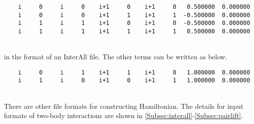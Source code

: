 \begin{description}
\begin{minipage}{16cm}
\begin{screen}
\begin{verbatim}
    i     0     i     0    i+1     0    i+1     0   0.500000  0.000000
    i     0     i     0    i+1     1    i+1     1  -0.500000  0.000000
    i     1     i     1    i+1     0    i+1     0  -0.500000  0.000000
    i     1     i     1    i+1     1    i+1     1   0.500000  0.000000
\end{verbatim}
\end{screen}
\end{minipage}
~\\
in the format of an InterAll file. The other terms can be written as below.\\
\begin{minipage}{16cm}
\begin{screen}
\begin{verbatim}
    i     0     i     1    i+1     1    i+1     0   1.000000  0.000000
    i     1     i     0    i+1     0    i+1     1   1.000000  0.000000
\end{verbatim}
\end{screen}
\end{minipage}
~\\
There are other file formats for constructing Hamiltonian. The details for input formats of two-body interactions are shown in \ref{Subsec:interall}-\ref{Subsec:pairlift}.

\end{description}

